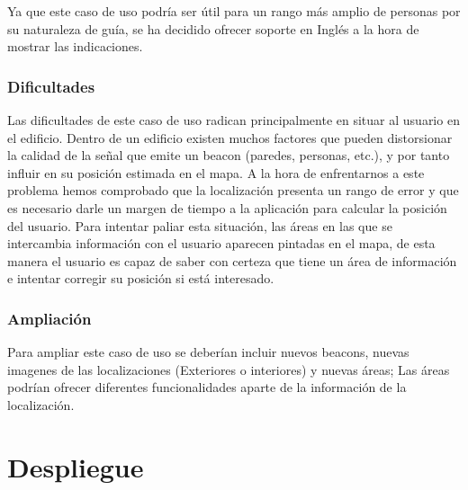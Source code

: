 Ya que este caso de uso podría ser útil para un rango más amplio de personas por su naturaleza de guía, se ha decidido ofrecer soporte en Inglés a la hora de mostrar las indicaciones.

\subsubsection{Dificultades}

Las dificultades de este caso de uso radican principalmente en situar al usuario en el edificio. Dentro de un edificio existen muchos factores que pueden distorsionar la calidad de la señal que emite un beacon (paredes, personas, etc.), y por tanto influir en su posición estimada en el mapa. A la hora de enfrentarnos a este problema hemos comprobado que la localización presenta un rango de error y que es necesario darle un margen de tiempo a la aplicación para calcular la posición del usuario. Para intentar paliar esta situación, las áreas en las que se intercambia información con el usuario aparecen pintadas en el mapa, de esta manera el usuario es capaz de saber con certeza que tiene un área de información e intentar corregir su posición si está interesado. 

\subsubsection{Ampliación}

Para ampliar este caso de uso se deberían incluir nuevos beacons, nuevas imagenes de las localizaciones (Exteriores o interiores) y nuevas áreas; Las áreas podrían ofrecer diferentes funcionalidades aparte de la información de la localización.






\section{Despliegue}




